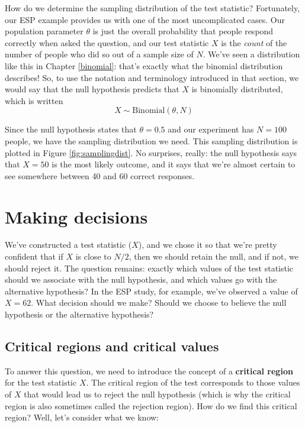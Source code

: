 \documentclass[
]{book}
\theoremstyle{definition}
\theoremstyle{definition}
\theoremstyle{definition}
\theoremstyle{definition}
\theoremstyle{remark}
\begin{document}
How do we determine the sampling distribution of the test statistic? Fortunately, our ESP example provides us with one of the most uncomplicated cases. Our population parameter \(\theta\) is just the overall probability that people respond correctly when asked the question, and our test statistic \(X\) is the \emph{count} of the number of people who did so out of a sample size of \(N\). We've seen a distribution like this in Chapter \ref{binomial}: that's exactly what the binomial distribution describes! So, to use the notation and terminology introduced in that section, we would say that the null hypothesis predicts that \(X\) is binomially distributed, which is written
\[
X \sim \mbox{Binomial}(\theta,N)
\]

Since the null hypothesis states that \(\theta = 0.5\) and our experiment has \(N=100\) people, we have the sampling distribution we need. This sampling distribution is plotted in Figure \ref{fig:samplingdist}. No surprises, really: the null hypothesis says that \(X=50\) is the most likely outcome, and it says that we're almost certain to see somewhere between 40 and 60 correct responses.

\hypertarget{decisionmaking}{%
\section{Making decisions}\label{decisionmaking}}

We've constructed a test statistic (\(X\)), and we chose it so that we're pretty confident that if \(X\) is close to \(N/2\), then we should retain the null, and if not, we should reject it. The question remains: exactly which values of the test statistic should we associate with the null hypothesis, and which values go with the alternative hypothesis? In the ESP study, for example, we've observed a value of \(X=62\). What decision should we make? Should we choose to believe the null hypothesis or the alternative hypothesis?

\hypertarget{critical-regions-and-critical-values}{%
\subsection{Critical regions and critical values}\label{critical-regions-and-critical-values}}

To answer this question, we need to introduce the concept of a \textbf{critical region} for the test statistic \(X\). The critical region of the test corresponds to those values of \(X\) that would lead us to reject the null hypothesis (which is why the critical region is also sometimes called the rejection region). How do we find this critical region? Well, let's consider what we know:
\end{document}
